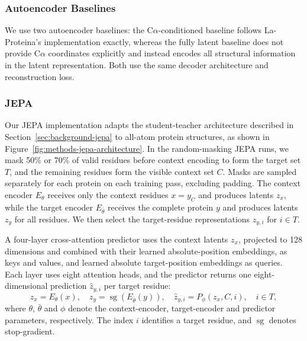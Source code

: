 \subsubsection{Autoencoder Baselines}

We use two autoencoder baselines: the C$\alpha$-conditioned baseline follows La-Proteina's implementation exactly, whereas the fully latent baseline does not provide C$\alpha$ coordinates explicitly and instead encodes all structural information in the latent representation. Both use the same decoder architecture and reconstruction loss.


\subsubsection{JEPA}


Our JEPA implementation adapts the student-teacher architecture described in Section~\ref{sec:background-jepa} to all-atom protein structures, as shown in Figure~\ref{fig:methods-jepa-architecture}.
In the random-masking JEPA runs, we mask 50\% or 70\% of valid residues before context encoding to form the target set $T$, and the remaining residues form the visible context set $C$. 
Masks are sampled separately for each protein on each training pass, excluding padding. The context encoder $E_\theta$ receives only the context residues $x=y_C$ and produces latents $z_x$, while the target encoder $E_{\bar\theta}$ receives the complete protein $y$ and produces latents $z_y$ for all residues. We then select the target-residue representations $z_{y,i}$ for $i\in T$.

A four-layer cross-attention predictor uses the context latents $z_x$, projected to 128 dimensions and combined with their learned absolute-position embeddings, as keys and values, and learned absolute target-position embeddings as queries. Each layer uses eight attention heads, and the predictor returns one eight-dimensional prediction $\hat z_{y,i}$ per target residue:
\begin{equation}
 z_x=E_\theta(x),\quad
 z_y=\operatorname{sg}\!\left(E_{\bar\theta}(y)\right),\quad
 \hat z_{y,i}=P_\phi(z_x,C,i),\quad i\in T,
\end{equation}
where $\theta$, $\bar\theta$ and $\phi$ denote the context-encoder, target-encoder and predictor parameters, respectively. The index $i$ identifies a target residue, and $\operatorname{sg}$ denotes stop-gradient.


